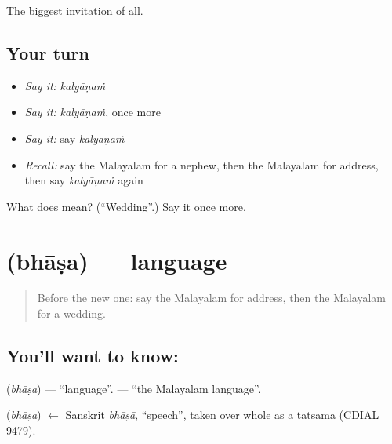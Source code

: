 \begin{grammarlens}[title={What you've built}]
The biggest invitation of all.
\end{grammarlens}

\subsection*{Your turn}
\begin{itemize}
\raggedright
  \item \emph{Say it:} \emph{kalyāṇaṁ}
  \item \emph{Say it:} \emph{kalyāṇaṁ}, once more
  \item \emph{Say it:} say \emph{kalyāṇaṁ}
  \item \emph{Recall:} say the Malayalam for a nephew, then the Malayalam for address, then say \emph{kalyāṇaṁ} again
\end{itemize}

\begin{tcolorbox}[breakable,colback=teal!4,colframe=teal!35!black,title={Before you move on}]
What does  mean? (\textquotedblleft{}Wedding\textquotedblright{}.) Say it once more.
\end{tcolorbox}
\section[\texorpdfstring{\ml{ഭാഷ} (bhāṣa)}{ഭാഷ (bhāṣa)}]{ (bhāṣa) — language}

\label{lesson:ML-C126-language}



\begin{quote}
Before the new one: say the Malayalam for address, then the Malayalam for a wedding.
\end{quote}

\subsection*{You'll want to know: }
\textbf{} (\emph{bhāṣa}) — \textquotedblleft{}language\textquotedblright{}. \textbf{ } — \textquotedblleft{}the Malayalam language\textquotedblright{}.

\begin{cousinweb}
\textbf{} (\emph{bhāṣa}) $\leftarrow$ Sanskrit \emph{bhāṣā}, \textquotedblleft{}speech\textquotedblright{}, taken over whole as a tatsama (CDIAL 9479).
\end{cousinweb}

